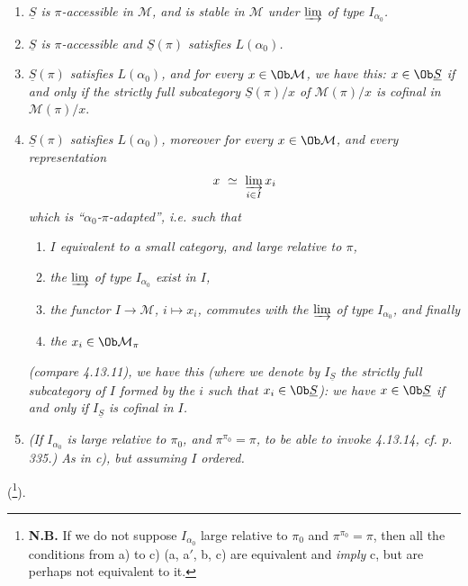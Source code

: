 \begin{enumerate}[label={}]
\item[\textit{a)}] \textit{$\underline{S}$ is $\pi$-accessible in $\mathcal{M}$, and is stable in $\mathcal{M}$ under $\varinjlim$ of type $I_{\alpha_0}$.}
\item[\textit{a$'$)}] \textit{$\underline{S}$ is $\pi$-accessible and $\underline{S}(\pi)$ satisfies $L(\alpha_0)$.}
\item[\textit{b)}] \textit{$\underline{S}(\pi)$ satisfies $L(\alpha_0)$, and for every $x \in \Ob\mathcal{M}$, we have this: $x \in \Ob\underline{S}$ if and only if the strictly full subcategory $\underline{S}(\pi)/x$ of $\mathcal{M}(\pi)/x$ is cofinal in $\mathcal{M}(\pi)/x$}.
\item[\textit{c)}] \textit{$\underline{S}(\pi)$ satisfies $L(\alpha_0)$, moreover for every $x \in \Ob\mathcal{M}$, and every representation}
\[
x \ \simeq \ \varinjlim_{i\in I} x_i
\]
\textit{which is ``$\alpha_0$-$\pi$-adapted'', i.e. such that}
\begin{enumerate}[label={}]
\item[\textit{$1^\circ$)}] \textit{$I$ equivalent to a small category, and large relative to $\pi$,}
\item[\textit{$2^\circ$)}] \textit{the $\varinjlim$ of type $I_{\alpha_0}$ exist in $I$,}
\item[\textit{$3^\circ$)}] \textit{the functor $I \longrightarrow \mathcal{M}$, $i \longmapsto x_i$, commutes with the $\varinjlim$ of type $I_{\alpha_0}$, and finally}
\item[\textit{$4^\circ$)}] \textit{the $x_i \in \Ob\mathcal{M}_\pi$}
\end{enumerate}
\textit{(compare 4.13.11), we have this (where we denote by $I_{\underline{S}}$ the strictly full subcategory of $I$ formed by the $i$ such that $x_i \in \Ob\underline{S}$): we have $x \in \Ob\underline{S}$ if and only if $I_{\underline{S}}$ is cofinal in $I$.}
\item[\textit{c$'$)}] \textit{(\textup{If} $I_{\alpha_0}$ is large relative to $\pi_0$, and $\pi^{\pi_0} = \pi$, to be able to invoke 4.13.14, cf. p. 335.) As in c), but assuming $I$ ordered.}
\end{enumerate}
(\footnote[143]{\textbf{N.B.} If we do not suppose $I_{\alpha_0}$ large relative to $\pi_0$ and %
$\pi^{\pi_0} = \pi$, then all the conditions from a) to c) (a, a$'$, b, c) are equivalent and \textit{imply} c, but are perhaps not equivalent to it.}).

